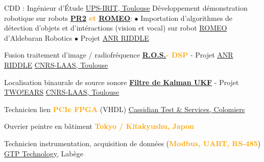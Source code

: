 \documentclass[
	a4paper,
	subsectioncolor=cvblue!70,
]{fortysecondscv}
\newcommand{\ros}{\href{http://www.ros.org/}{R.O.S.}}
\newcommand{\hl}[1]{\textbf{\textcolor{orange}{#1}}}
\begin{document}
\begin{cvtable}[2]
  {CDD : Ingénieur d'Étude}
  {\href{https://www.irit.fr/?lang=fr}{UPS-IRIT, Toulouse}}
  {
    Développement démonstration robotique sur robots
    \hl{\href{http://www.willowgarage.com/pages/pr2/overview}{PR2} et
      \href{https://spectrum.ieee.org/automaton/robotics/humanoids/aldebaran-robotics-introduces-romeo-finally}{ROMEO}}:\newline
    $\bullet$ Importation d'algorithmes de détection d'objets et d'intéractions (vision
    et vocal) sur robot \href{https://spectrum.ieee.org/automaton/robotics/humanoids/aldebaran-robotics-introduces-romeo-finally}{ROMEO}
    d'Aldebaran Robotics\newline
    $\bullet$ Projet
    \href{http://www.agence-nationale-recherche.fr/Project-ANR-12-CORD-0003}{ANR
      RIDDLE}
  }
\end{cvtable}

\begin{cvtable}[2]
  {
    Fusion traitement d'image / radiofréquence\newline
    \hl{\ros - DSP} - Projet
    \href{http://www.agence-nationale-recherche.fr/Project-ANR-12-CORD-0003}{ANR
      RIDDLE}
  }
  {\href{https://www.laas.fr/public/fr}{CNRS-LAAS, Toulouse}}
  {}

  {
    Localisation binaurale de source sonore\newline
    \hl{\href{https://en.wikipedia.org/wiki/Kalman_filter\#Unscented_Kalman_filter}{Filtre de Kalman UKF}} - Projet \href{http://twoears.eu/}{TWO!EARS}
  }
  {\href{https://www.laas.fr/public/fr}{CNRS-LAAS, Toulouse}}
  {}

  {Technicien lien \hl{PCIe FPGA} (VHDL)}
  {\href{http://www.spherea.com/fr}{Cassidian Test \& Services, Colomiers}}
  {}

  {Ouvrier peintre en bâtiment}
  {\hl{Tokyo / Kitakyushu, Japon}}
  {}

  {Technicien instrumentation, acquisition de données (\hl{Modbus, UART, RS-485})}
  {\href{https://www.gtptech.com/}{GTP Technology}, Labège}
  {}
\end{cvtable}



\cvsignature
\end{document}
